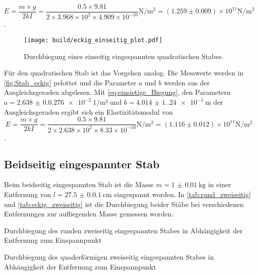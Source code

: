\begin{equation*}
  E=\frac{m \times g}{2kI} = \frac{0.5 \times 9.81}{2 \times 3.968 \times 10^{2} \times 4.909 \times 10^{-10}} \unit{\newton\per\meter\squared} = (1.259 \pm 0.009) \times 10^{11} \unit{\newton\per\meter\squared}
\end{equation*}.


\begin{figure}[H]
  \centering
  \texttt{[image: build/eckig\_einseitig\_plot.pdf]}
  \caption{Durchbiegung eines einseitig eingespannten quadratischen Stabes.}
  \label{fig:Stab_eckig}
\end{figure}

\noindent Für den quadratischen Stab ist das Vorgehen analog. Die Messwerte werden in \autoref{fig:Stab_eckig} pelottet und die Parameter $a$ und $b$ werden aus der Ausgleichsgeraden abgelesen. Mit \autoref{eq:einsietige_Biegung}, den Parametern $a=\SI{2.638(0.0276)e-2}{1\per\meter²}$ und $b=\SI{4.014(1.24)e-5}{\meter}$ der Ausgleichsgeraden ergibt sich ein Elastizitätsmodul von
\begin{equation*}
  E=\frac{m \times g}{2kI} = \frac{0.5 \times 9.81}{2 \times 2.638 \times 10^{2} \times 8.33 \times 10^{-10}} \unit{\newton\per\meter\squared} = (1.116 \pm 0.012) \times 10^{11} \unit{\newton\per\meter\squared}
\end{equation*}.

\subsection{Beidseitig eingespannter Stab}

Beim beidseitig eingespannten Stab ist die Masse $m=\qty{1(0.01)}{\kilo\gram}$ in einer Entfernung von $l=\qty{27.5(0.01)}{\centi\meter}$
eingespannt worden. In \autoref{tab:rund_zweiseitig} und \autoref{tab:eckig_zweiseitig} ist die Durchbiegung beider Stäbe bei verschiedenen Entfernungen zur
aufliegenden Masse gemessen worden.

\begin{table}[H]
  \centering
  \begin{minipage}[b]{0.5\textwidth}
    \centering
    
    \caption{Durchbiegung des runden zweiseitig eingespannten Stabes in Abhängigkeit der Entfernung zum Einspannpunkt}
    \label{tab:rund_zweiseitig}
  \end{minipage}
  \hfill
  \begin{minipage}[b]{0.5\textwidth}
    \centering
    
    \caption{Durchbiegung des quaderförmigen zweiseitig eingespannten Stabes in Abhängigkeit der Entfernung zum Einspannpunkt}
    \label{tab:eckig_zweiseitig}
  \end{minipage}
\end{table}

